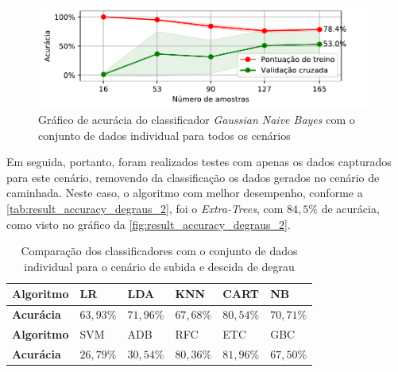 \begin{figure}[ht]
	\caption{\label{fig:result_accuracy_degraus_1}Gráfico de acurácia do classificador \textit{Gaussian Naive Bayes} com o conjunto de dados individual para todos os cenários}
	\begin{center}
		\includegraphics[width=\textwidth]{resources/result_accuracy_degraus_1}
	\end{center}
\end{figure}
\newpage
Em seguida, portanto, foram realizados testes com apenas os dados capturados para este cenário, removendo da classificação os dados gerados no cenário de caminhada. Neste caso, o algoritmo com melhor desempenho, conforme a \autoref{tab:result_accuracy_degraus_2}, foi o \textit{Extra-Trees}, com \(84{,}5\%\) de acurácia, como visto no gráfico da \autoref{fig:result_accuracy_degraus_2}.

\begin{table}[ht]
	\caption{Comparação dos classificadores com o conjunto de dados individual para o cenário de subida e descida de degrau}%
	\label{tab:result_accuracy_degraus_2}
	\begin{tabularx}{\textwidth}{X X X X X X}
		\toprule
		\textbf{Algoritmo} & LR            & LDA           & KNN           & CART          & NB            \\ \midrule
		\textbf{Acurácia}  & \(63{,}93\%\) & \(71{,}96\%\) & \(67{,}68\%\) & \(80{,}54\%\) & \(70{,}71\%\) \\ \bottomrule \toprule
		\textbf{Algoritmo} & SVM           & ADB           & RFC           & ETC           & GBC           \\ \midrule
		\textbf{Acurácia}  & \(26{,}79\%\) & \(30{,}54\%\) & \(80{,}36\%\) & \(81{,}96\%\) & \(67{,}50\%\) \\ \bottomrule
	\end{tabularx}
\end{table}

